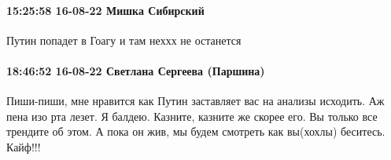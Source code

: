  
 
 
 
 

\paragraph{15:25:58 16-08-22 Мишка Сибирский}

Путин попадет в Гоагу и там неххх не останется

\paragraph{18:46:52 16-08-22 Светлана Сергеева (Паршина)}

Пиши-пиши, мне нравится как Путин заставляет вас на анализы исходить. Аж пена
изо рта лезет. Я балдею. Казните, казните же скорее его. Вы только все трендите
об этом. А пока он жив, мы будем смотреть как вы(хохлы) беситесь. Кайф!!!
